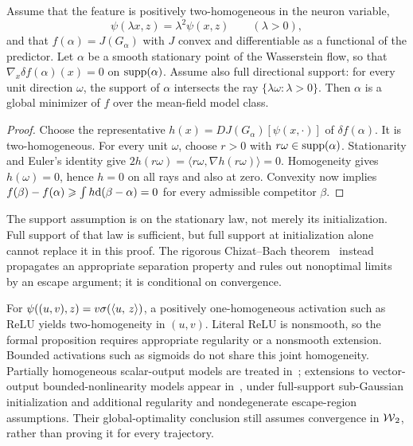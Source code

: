 \begin{prop}\label{prop-formal-chizat-bach}
	Assume that the feature is positively two-homogeneous in the neuron variable,
	\[
		\psi(\lambda x,z)=\lambda^2\psi(x,z)
		\qquad(\lambda>0),
	\]
	and that $f(\alpha)=J(G_\alpha)$ with $J$ convex and differentiable as a functional of the predictor. Let $\alpha$ be a smooth stationary point of the Wasserstein flow, so that $\nabla_x\delta f(\alpha)(x)=0$ on $\operatorname{supp}(\alpha)$. Assume also full directional support: for every unit direction $\omega$, the support of $\alpha$ intersects the ray $\{\lambda\omega:\lambda>0\}$. Then $\alpha$ is a global minimizer of $f$ over the mean-field model class.
\end{prop}
\begin{proof}
Choose the representative $h(x)=DJ(G_\alpha)[\psi(x,\cdot)]$ of $\delta f(\alpha)$. It is two-homogeneous. For every unit $\omega$, choose $r>0$ with $r\omega\in\operatorname{supp}(\alpha)$. Stationarity and Euler's identity give $2h(r\omega)=\langle r\omega,\nabla h(r\omega)\rangle=0$. Homogeneity gives $h(\omega)=0$, hence $h=0$ on all rays and also at zero. Convexity now implies $f(\beta)-f(\alpha)\geqslant\int h\mathrm{d}(\beta-\alpha)=0$ for every admissible competitor $\beta$.
\end{proof}
The support assumption is on the stationary law, not merely its initialization. Full support of that law is sufficient, but full support at initialization alone cannot replace it in this proof. The rigorous Chizat--Bach theorem~\cite{ChizatBach2018OverparameterizedOT} instead propagates an appropriate separation property and rules out nonoptimal limits by an escape argument; it is conditional on convergence.

For $\psi((u,v),z)=v\sigma(\langle u,\,z\rangle)$, a positively one-homogeneous activation such as ReLU yields two-homogeneity in $(u,v)$. Literal ReLU is nonsmooth, so the formal proposition requires appropriate regularity or a nonsmooth extension. Bounded activations such as sigmoids do not share this joint homogeneity. Partially homogeneous scalar-output models are treated in~\cite{ChizatBach2018OverparameterizedOT}; extensions to vector-output bounded-nonlinearity models appear in~\cite{PetitPoonPeyre2026GlobalFlow}, under full-support sub-Gaussian initialization and additional regularity and nondegenerate escape-region assumptions. Their global-optimality conclusion still assumes convergence in $\operatorname{\mathcal{W}}_2$, rather than proving it for every trajectory.

